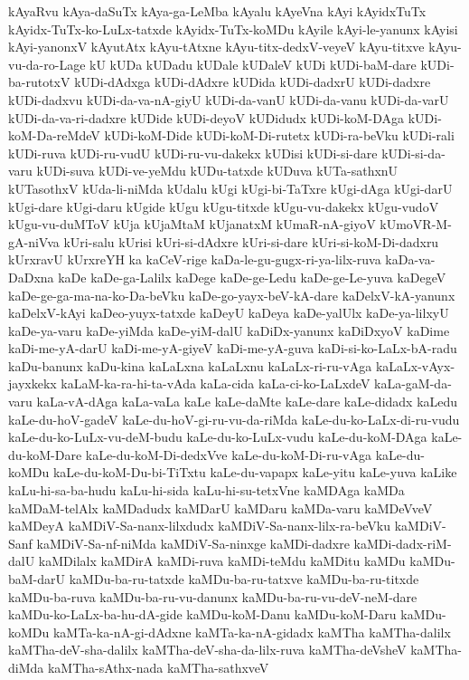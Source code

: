 {kAyaRvu
kAya-daSuTx
kAya-ga-LeMba
kAyalu
kAyeVna
kAyi
kAyidxTuTx
kAyidx-TuTx-ko-LuLx-tatxde
kAyidx-TuTx-koMDu
kAyile
kAyi-le-yanunx
kAyisi
kAyi-yanonxV
kAyutAtx
kAyu-tAtxne
kAyu-titx-dedxV-veyeV
kAyu-titxve
kAyu-vu-da-ro-Lage
kU
kUDa
kUDadu
kUDale
kUDaleV
kUDi
kUDi-baM-dare
kUDi-ba-rutotxV
kUDi-dAdxga
kUDi-dAdxre
kUDida
kUDi-dadxrU
kUDi-dadxre
kUDi-dadxvu
kUDi-da-va-nA-giyU
kUDi-da-vanU
kUDi-da-vanu
kUDi-da-varU
kUDi-da-va-ri-dadxre
kUDide
kUDi-deyoV
kUDidudx
kUDi-koM-DAga
kUDi-koM-Da-reMdeV
kUDi-koM-Dide
kUDi-koM-Di-rutetx
kUDi-ra-beVku
kUDi-rali
kUDi-ruva
kUDi-ru-vudU
kUDi-ru-vu-dakekx
kUDisi
kUDi-si-dare
kUDi-si-da-varu
kUDi-suva
kUDi-ve-yeMdu
kUDu-tatxde
kUDuva
kUTa-sathxnU
kUTasothxV
kUda-li-niMda
kUdalu
kUgi
kUgi-bi-TaTxre
kUgi-dAga
kUgi-darU
kUgi-dare
kUgi-daru
kUgide
kUgu
kUgu-titxde
kUgu-vu-dakekx
kUgu-vudoV
kUgu-vu-duMToV
kUja
kUjaMtaM
kUjanatxM
kUmaR-nA-giyoV
kUmoVR-M-gA-niVva
kUri-salu
kUrisi
kUri-si-dAdxre
kUri-si-dare
kUri-si-koM-Di-dadxru
kUrxravU
kUrxreYH
ka
kaCeV-rige
kaDa-le-gu-gugx-ri-ya-lilx-ruva
kaDa-va-DaDxna
kaDe
kaDe-ga-Lalilx
kaDege
kaDe-ge-Ledu
kaDe-ge-Le-yuva
kaDegeV
kaDe-ge-ga-ma-na-ko-Da-beVku
kaDe-go-yayx-beV-kA-dare
kaDelxV-kA-yanunx
kaDelxV-kAyi
kaDeo-yuyx-tatxde
kaDeyU
kaDeya
kaDe-yalUlx
kaDe-ya-lilxyU
kaDe-ya-varu
kaDe-yiMda
kaDe-yiM-dalU
kaDiDx-yanunx
kaDiDxyoV
kaDime
kaDi-me-yA-darU
kaDi-me-yA-giyeV
kaDi-me-yA-guva
kaDi-si-ko-LaLx-bA-radu
kaDu-banunx
kaDu-kina
kaLaLxna
kaLaLxnu
kaLaLx-ri-ru-vAga
kaLaLx-vAyx-jayxkekx
kaLaM-ka-ra-hi-ta-vAda
kaLa-cida
kaLa-ci-ko-LaLxdeV
kaLa-gaM-da-varu
kaLa-vA-dAga
kaLa-vaLa
kaLe
kaLe-daMte
kaLe-dare
kaLe-didadx
kaLedu
kaLe-du-hoV-gadeV
kaLe-du-hoV-gi-ru-vu-da-riMda
kaLe-du-ko-LaLx-di-ru-vudu
kaLe-du-ko-LuLx-vu-deM-budu
kaLe-du-ko-LuLx-vudu
kaLe-du-koM-DAga
kaLe-du-koM-Dare
kaLe-du-koM-Di-dedxVve
kaLe-du-koM-Di-ru-vAga
kaLe-du-koMDu
kaLe-du-koM-Du-bi-TiTxtu
kaLe-du-vapapx
kaLe-yitu
kaLe-yuva
kaLike
kaLu-hi-sa-ba-hudu
kaLu-hi-sida
kaLu-hi-su-tetxVne
kaMDAga
kaMDa
kaMDaM-telAlx
kaMDadudx
kaMDarU
kaMDaru
kaMDa-varu
kaMDeVveV
kaMDeyA
kaMDiV-Sa-nanx-lilxdudx
kaMDiV-Sa-nanx-lilx-ra-beVku
kaMDiV-Sanf
kaMDiV-Sa-nf-niMda
kaMDiV-Sa-ninxge
kaMDi-dadxre
kaMDi-dadx-riM-dalU
kaMDilalx
kaMDirA
kaMDi-ruva
kaMDi-teMdu
kaMDitu
kaMDu
kaMDu-baM-darU
kaMDu-ba-ru-tatxde
kaMDu-ba-ru-tatxve
kaMDu-ba-ru-titxde
kaMDu-ba-ruva
kaMDu-ba-ru-vu-danunx
kaMDu-ba-ru-vu-deV-neM-dare
kaMDu-ko-LaLx-ba-hu-dA-gide
kaMDu-koM-Danu
kaMDu-koM-Daru
kaMDu-koMDu
kaMTa-ka-nA-gi-dAdxne
kaMTa-ka-nA-gidadx
kaMTha
kaMTha-dalilx
kaMTha-deV-sha-dalilx
kaMTha-deV-sha-da-lilx-ruva
kaMTha-deVsheV
kaMTha-diMda
kaMTha-sAthx-nada
kaMTha-sathxveV
}
